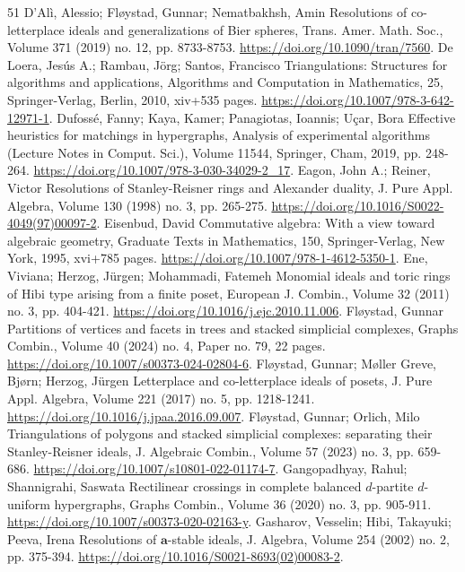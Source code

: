 \documentclass[10pt,a4paper]{article}
\theoremstyle{definition}
\theoremstyle{remark}
\theoremstyle{plain}
\begin{document}
\begin{thebibliography}{51}
 D’Alì, Alessio; Fløystad, Gunnar; Nematbakhsh, Amin Resolutions of co-letterplace ideals and generalizations of Bier spheres, Trans. Amer. Math. Soc., Volume 371 (2019) no. 12, pp. 8733-8753. \url{https://doi.org/10.1090/tran/7560}.
 De Loera, Jesús A.; Rambau, Jörg; Santos, Francisco Triangulations: Structures for algorithms and applications, Algorithms and Computation in Mathematics, 25, Springer-Verlag, Berlin, 2010, xiv+535 pages. \url{https://doi.org/10.1007/978-3-642-12971-1}.
 Dufossé, Fanny; Kaya, Kamer; Panagiotas, Ioannis; Uçar, Bora Effective heuristics for matchings in hypergraphs, Analysis of experimental algorithms (Lecture Notes in Comput. Sci.), Volume 11544, Springer, Cham, 2019, pp. 248-264. \url{https://doi.org/10.1007/978-3-030-34029-2_17}.
 Eagon, John A.; Reiner, Victor Resolutions of Stanley-Reisner rings and Alexander duality, J. Pure Appl. Algebra, Volume 130 (1998) no. 3, pp. 265-275. \url{https://doi.org/10.1016/S0022-4049(97)00097-2}.
 Eisenbud, David Commutative algebra: With a view toward algebraic geometry, Graduate Texts in Mathematics, 150, Springer-Verlag, New York, 1995, xvi+785 pages. \url{https://doi.org/10.1007/978-1-4612-5350-1}.
 Ene, Viviana; Herzog, Jürgen; Mohammadi, Fatemeh Monomial ideals and toric rings of Hibi type arising from a finite poset, European J. Combin., Volume 32 (2011) no. 3, pp. 404-421. \url{https://doi.org/10.1016/j.ejc.2010.11.006}.
 Fløystad, Gunnar Partitions of vertices and facets in trees and stacked simplicial complexes, Graphs Combin., Volume 40 (2024) no. 4, Paper no. 79, 22 pages. \url{https://doi.org/10.1007/s00373-024-02804-6}.
 Fløystad, Gunnar; Møller Greve, Bjørn; Herzog, Jürgen Letterplace and co-letterplace ideals of posets, J. Pure Appl. Algebra, Volume 221 (2017) no. 5, pp. 1218-1241. \url{https://doi.org/10.1016/j.jpaa.2016.09.007}.
 Fløystad, Gunnar; Orlich, Milo Triangulations of polygons and stacked simplicial complexes: separating their Stanley-Reisner ideals, J. Algebraic Combin., Volume 57 (2023) no. 3, pp. 659-686. \url{https://doi.org/10.1007/s10801-022-01174-7}.
 Gangopadhyay, Rahul; Shannigrahi, Saswata Rectilinear crossings in complete balanced $d$-partite $d$-uniform hypergraphs, Graphs Combin., Volume 36 (2020) no. 3, pp. 905-911. \url{https://doi.org/10.1007/s00373-020-02163-y}.
 Gasharov, Vesselin; Hibi, Takayuki; Peeva, Irena Resolutions of $\mathbf{a}$-stable ideals, J. Algebra, Volume 254 (2002) no. 2, pp. 375-394. \url{https://doi.org/10.1016/S0021-8693(02)00083-2}.

\end{thebibliography}
\end{document}

